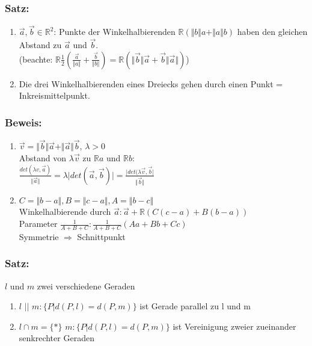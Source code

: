 \subsubsection{Satz:}
\begin{enumerate}
	\item $\vec{a},\vec{b}\in\mathbb{R}^{2}$: Punkte der Winkelhalbierenden  
	$\mathbb{R}(\Vert b\Vert a+\Vert a\Vert b)$ haben den gleichen Abstand zu 
	$\vec{a}$ und $\vec{b}$. \\
	(beachte: $\mathbb{R}\frac{1}{2}(\frac{\vec{a}}{\Vert a\Vert}+\frac{\vec{b}}{\Vert 
	b\Vert})=\mathbb{R}(\Vert \vec{b}\Vert\vec{a}+\vec{b}\Vert\vec{a}\Vert)$)
	\item Die drei Winkelhalbierenden eines Dreiecks gehen durch einen Punkt = 
	Inkreismittelpunkt.
\end{enumerate}
%
%
%
\subsubsection{Beweis:}
\begin{enumerate}
	\item $\vec{v}=\Vert\vec{b}\Vert\vec{a}+\Vert\vec{a}\Vert\vec{b}, \, \lambda >0$\\
	Abstand von $\lambda\vec{v}$ zu $\mathbb{R}a$ und $\mathbb{R}b:$\\
	$\frac{det(\lambda v,\vec{a})}{\Vert\vec{a}\Vert}=\lambda \vert det(\vec{a},
	\vec{b})\vert = \frac{\vert det(\lambda \vec{v},\vec{b}\vert}{\Vert\vec{b}\Vert}$
	\item $C = \Vert b-a\Vert, B=\Vert c-a \Vert, A=\Vert b-c \Vert$\\
	Winkelhalbierende durch $\vec{a}: \vec{a}+\mathbb{R}(C(c-a)+B(b-a))$\\
	Parameter $\frac{1}{A+B+C}:\frac{1}{A+B+C}(Aa+Bb+Cc)$\\
	Symmetrie $\Rightarrow$ Schnittpunkt
\end{enumerate}
%
%
%
\subsubsection{Satz:}
$l$ und $m$ zwei verschiedene Geraden
\begin{enumerate}
	\item $l$ $||$ $m: \{P|d(P,l)=d(P,m)\}$ ist Gerade parallel zu l und m 
	\item $l \cap m=\{*\}$ $m: \{P|d(P,l)=d(P,m)\}$ ist Vereinigung zweier zueinander 
	senkrechter Geraden
\end{enumerate}
%
%
%
